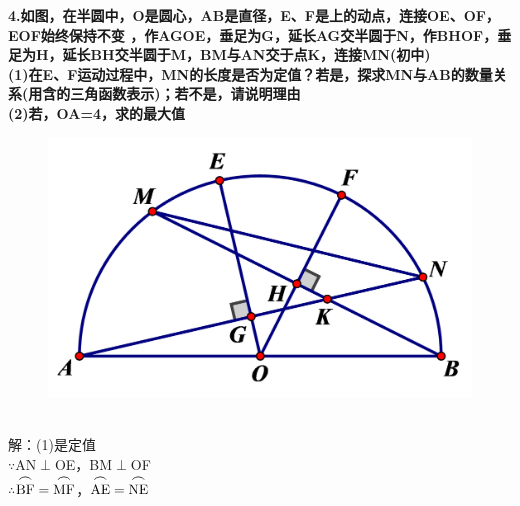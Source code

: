 \documentclass{article}
\begin{document}
    \newpage
    \noindent \textbf{4.如图，在半圆中，O是圆心，AB是直径，E、F是上的动点，连接OE、OF，\bm{$\angle $}EOF始终保持\bm{$\alpha $}不变
    ，作AG\bm{$\perp $}OE，垂足为G，延长AG交半圆于N，作BH\bm{$\perp $}OF，垂足为H，延长BH交半圆于M，BM与AN交于点K，连接MN(初中) \\
    (1)在E、F运动过程中，MN的长度是否为定值？若是，探求MN与AB的数量关系(用含\bm{$\alpha $}的三角函数表示)；若不是，请说明理由 \\
    (2)若，OA=4，求的最大值} \\
    \begin{figure}[ht]
        \centering
        \includegraphics[scale=0.2]{4.png}
    \end{figure}\\
    解：(1)是定值\\
    $\because $\quad AN$\perp $OE，BM$\perp $OF \\
    $\therefore $\quad ${\stackrel{{\mbox{$\Large{\frown}$}}}{\text{BF}}}={\stackrel{{\mbox{$\Large{\frown}$}}}{\text{MF}}}$，${\stackrel{{\mbox{$\Large{\frown}$}}}{\text{AE}}}={\stackrel{{\mbox{$\Large{\frown}$}}}{\text{NE}}}$ \\
\end{document}
